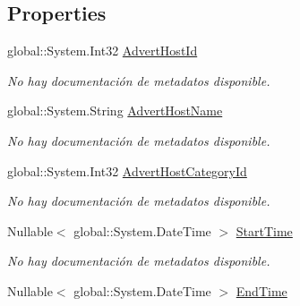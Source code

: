 \subsection*{Properties}
\begin{DoxyCompactItemize}
\item 
global\-::\-System.\-Int32 \hyperlink{class_microsoft_1_1_samples_1_1_kinect_1_1_basic_interactions_1_1_advert_hosts_ab2a6e9d06b43205eff47240517819f8f}{Advert\-Host\-Id}
\begin{DoxyCompactList}\small\item\em No hay documentación de metadatos disponible. \end{DoxyCompactList}\item 
global\-::\-System.\-String \hyperlink{class_microsoft_1_1_samples_1_1_kinect_1_1_basic_interactions_1_1_advert_hosts_a6aaa5465af860852d96a0801429f4155}{Advert\-Host\-Name}
\begin{DoxyCompactList}\small\item\em No hay documentación de metadatos disponible. \end{DoxyCompactList}\item 
global\-::\-System.\-Int32 \hyperlink{class_microsoft_1_1_samples_1_1_kinect_1_1_basic_interactions_1_1_advert_hosts_adddb1d79e7b5c5289db32652166ab964}{Advert\-Host\-Category\-Id}
\begin{DoxyCompactList}\small\item\em No hay documentación de metadatos disponible. \end{DoxyCompactList}\item 
Nullable$<$ global\-::\-System.\-Date\-Time $>$ \hyperlink{class_microsoft_1_1_samples_1_1_kinect_1_1_basic_interactions_1_1_advert_hosts_a06ba7fc7c52bcf0071a4059b276a6d52}{Start\-Time}
\begin{DoxyCompactList}\small\item\em No hay documentación de metadatos disponible. \end{DoxyCompactList}\item 
Nullable$<$ global\-::\-System.\-Date\-Time $>$ \hyperlink{class_microsoft_1_1_samples_1_1_kinect_1_1_basic_interactions_1_1_advert_hosts_a57a62637bdd5ec87b6095df6027baefd}{End\-Time}

\end{DoxyCompactItemize}

